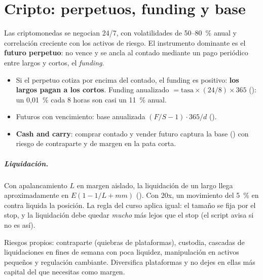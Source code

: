 \chapter{Cripto: perpetuos, funding y base}\label{cap:cripto}

Las criptomonedas se negocian 24/7, con volatilidades de 50--80~\% anual y correlación creciente con
los activos de riesgo. El instrumento dominante es el \textbf{futuro perpetuo}: no vence y se ancla al
contado mediante un pago periódico entre largos y cortos, el \emph{funding}.
\begin{itemize}
\item Si el perpetuo cotiza por encima del contado, el funding es positivo: \textbf{los largos pagan a
  los cortos}. Funding anualizado $= \text{tasa}\times(24/8)\times365$ ():
  un 0,01~\% cada 8 horas son casi un 11~\% anual.
\item Futuros con vencimiento: base anualizada $(F/S-1)\cdot365/d$ ().
\item \textbf{Cash and carry}: comprar contado y vender futuro captura la base ()
  con riesgo de contraparte y de margen en la pata corta.
\end{itemize}

\paragraph{Liquidación.} Con apalancamiento $L$ en margen aislado, la liquidación de un largo llega
aproximadamente en $E(1-1/L+mm)$ (). Con 20x, un movimiento del 5~\% en
contra liquida la posición. La regla del curso aplica igual: el tamaño se fija por el stop, y la
liquidación debe quedar \emph{mucho} más lejos que el stop (el script 
avisa si no es así).

\begin{aviso}
Riesgos propios: contraparte (quiebras de plataformas), custodia, cascadas de liquidaciones en fines de
semana con poca liquidez, manipulación en activos pequeños y regulación cambiante. Diversifica
plataformas y no dejes en ellas más capital del que necesitas como margen.
\end{aviso}
